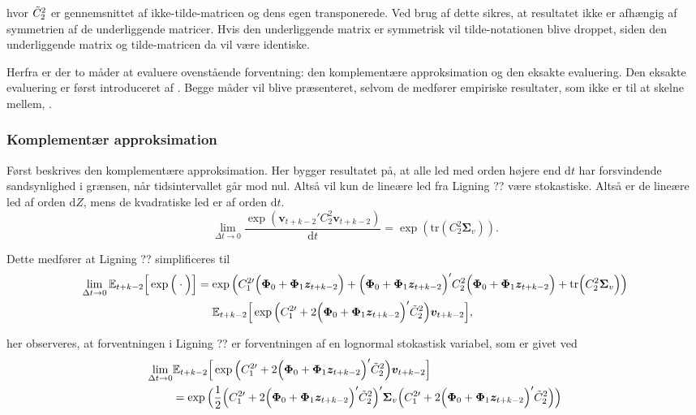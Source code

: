 \documentclass[
  a4paper,
  oneside]{memoir}
\begin{document}
hvor \(\Tilde{C}_2^{2}\) er gennemsnittet af ikke-tilde-matricen og dens egen transponerede. Ved brug af dette sikres, at resultatet ikke er afhængig af symmetrien af de underliggende matricer. Hvis den underliggende matrix er symmetrisk vil tilde-notationen blive droppet, siden den underliggende matrix og tilde-matricen da vil være identiske.

Herfra er der to måder at evaluere ovenstående forventning: den komplementære approksimation og den eksakte evaluering. Den eksakte evaluering er først introduceret af \citep{CampVicCha2003}. Begge måder vil blive præsenteret, selvom de medfører empiriske resultater, som ikke er til at skelne mellem, \citep{JurVic2011}.

\hypertarget{komplementuxe6r-approksimation}{%
\subsubsection{Komplementær approksimation}\label{komplementuxe6r-approksimation}}

Først beskrives den komplementære approksimation. Her bygger resultatet på, at alle led med orden højere end \(\text{d}t\) har forsvindende sandsynlighed i grænsen, når tidsintervallet går mod nul. Altså vil kun de lineære led fra Ligning ?? være stokastiske. Altså er de lineære led af orden \(\text{d}Z\), mens de kvadratiske led er af orden \(\text{d}t\).
\[\lim_{\Delta t \to 0}\frac{\exp\left( \bm{v}_{t+k-2}' C_2^2 \bm{v}_{t+k-2} \right)}{\text{d}t}=\exp\left( \text{tr}\left(C_2^2 \bm{\Sigma}_v\right) \right).\]

Dette medfører at Ligning ?? simplificeres til
\begin{align*}
\lim_{\Delta t \to 0}\mathbb{E}_{t+k-2}\Big[\exp\Big(\cdot\Big)\Big] &=\exp\Big( C_1^{2\prime} \Big(\bm{\Phi}_0+\bm{\Phi}_1\bm{z}_{t+k-2} \Big) + \Big(\bm{\Phi}_0+\bm{\Phi}_1\bm{z}_{t+k-2} \Big)' C_2^2 \Big(\bm{\Phi}_0+\bm{\Phi}_1\bm{z}_{t+k-2}\Big) +  \text{tr}\Big(C_2^2 \bm{\Sigma}_v\Big)\Big)\\
                                &\,\,\quad \mathbb{E}_{t+k-2}\Big[ \exp\Big( C_1^{2\prime} + 2\Big(\bm{\Phi}_0+\bm{\Phi}_1\bm{z}_{t+k-2}\Big)' \Tilde{C}_2^{2} \Big)   \bm{v}_{t+k-2}\Big],
\end{align*}

her observeres, at forventningen i Ligning ?? er forventningen af en lognormal stokastisk variabel, som er givet ved
\begin{align*}
\lim_{\Delta t \to 0}&\mathbb{E}_{t+k-2}\Big[ \exp\Big( C_1^{2\prime} + 2\Big(\bm{\Phi}_0+\bm{\Phi}_1\bm{z}_{t+k-2}\Big)' \Tilde{C}_2^{2} \Big)   \bm{v}_{t+k-2}\Big]\\
&=\exp\Big(\frac{1}{2} \Big(C_1^{2\prime} + 2\Big(\bm{\Phi}_0+\bm{\Phi}_1\bm{z}_{t+k-2}\Big)' \Tilde{C}_2^{2}\Big)' \bm{\Sigma}_v \Big(C_1^{2\prime} + 2\Big(\bm{\Phi}_0+\bm{\Phi}_1\bm{z}_{t+k-2}\Big)' \Tilde{C}_2^{2}\Big)\Big) 
\end{align*}
\end{document}
